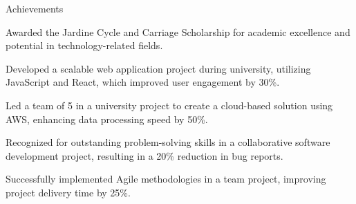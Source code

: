 \documentclass{resume} %
\begin{document}
    \begin{rSection}{Achievements}
        \begin{rSubsection}{}{}{}
                            \item Awarded the Jardine Cycle and Carriage Scholarship for academic excellence and potential in technology{-}related fields.
                            \item Developed a scalable web application project during university, utilizing JavaScript and React, which improved user engagement by 30\%.
                            \item Led a team of 5 in a university project to create a cloud{-}based solution using AWS, enhancing data processing speed by 50\%.
                            \item Recognized for outstanding problem{-}solving skills in a collaborative software development project, resulting in a 20\% reduction in bug reports.
                            \item Successfully implemented Agile methodologies in a team project, improving project delivery time by 25\%.
                    \end{rSubsection}
    \end{rSection}
\end{document}
